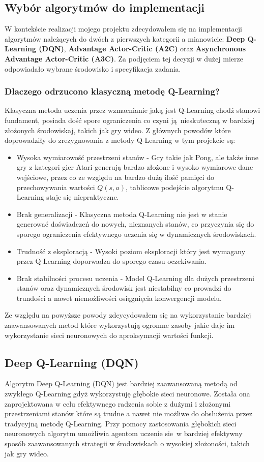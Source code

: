 \documentclass[a4paper, 12pt]{article}
\begin{document}
    \subsection{Wybór algorytmów do implementacji}
    W kontekście realizacji mojego projektu zdecydowałem się na implementacji algorytmów należących do dwóch z pierwszych kategorii a mianowicie:
    \textbf{Deep Q-Learning (DQN)}, \textbf{Advantage Actor-Critic (A2C)} oraz \textbf{Asynchronous Advantage Actor-Critic (A3C)}.
    Za podjęciem tej decyzji w dużej mierze odpowiadało wybrane środowisko i specyfikacja zadania.
    \subsubsection{Dlaczego odrzucono klasyczną metodę Q-Learning?}
    Klasyczna metoda uczenia przez wzmacnianie jaką jest Q-Learning chodź stanowi fundament, posiada dość spore ograniczenia co 
    czyni ją nieskuteczną w bardziej złożonych środowiskaj, takich jak gry wideo. Z głównych powodów które doprowadziły 
    do zrezygnowania z metody Q-Learning w tym projekcie są:
    \begin{itemize}
        \item Wysoka wymiarowość przestrzeni stanów - Gry takie jak Pong, ale także inne gry z kategori gier Atari generują bardzo złożone 
        i wysoko wymiarowe dane wejściowe, przez co ze względu na bardzo dużą ilość pamięci do przechowywania wartości \( Q(s,a) \),
        tablicowe podejście algorytmu Q-Learning staje się niepraktyczne.
        \item Brak generalizacji - Klasyczna metoda Q-Learning nie jest w stanie generować doświadczeń do nowych, nieznanych stanów, co 
        przyczynia się do sporego ograniczenia efektywnego uczenia się w dynamicznych środowiskach.
        \item Trudność z eksploracją - Wysoki poziom eksploracji który jest wymagany przez Q-Learning doporwadza do sporego czasu oczekiwania.
        \item Brak stabilności procesu uczenia - Model Q-Learning dla dużych przestrzeni stanów oraz dynamicznych środowisk jest niestabilny co prowadzi
        do trundości a nawet niemożliwości osiągnięcia konwergencji modelu. 
    \end{itemize}
    Ze względu na powyższe powody zdeycydowałem się na wykorzystanie bardziej zaawansowanych metod które wykorzystują ogromne zasoby jakie daje im 
    wykorzystanie sieci neuronowych do aproksymacji wartości funkcji.
    \subsection{Deep Q-Learning (DQN)}
    Algorytm Deep Q-Learning (DQN) jest bardziej zaawansowaną metodą od zwykłego Q-Learning gdyż wykorzystuję głębokie sieci neuronowe.
    Została ona zaprojektowana w celu efektywnego radzenia sobie z dużymi i złożonymi przestrzeniami stanów które są trudne a nawet nie możliwe
    do obsłużenia przez tradycyjną metodę Q-Learning. Przy pomocy zastosowania głębokich sieci neuronowych algorytm umożliwia agentom
    uczenie sie w bardziej efektywny sposób zaawansowanych strategii w środowiskach o wysokiej złożoności, takich jak gry wideo.
\end{document}
